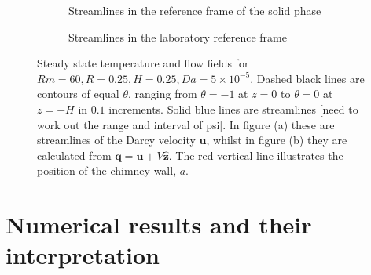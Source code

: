 \documentclass[11pt]{proc}
\begin{document}
\begin{figure}[ht!]
\centering
\begin{subfigure}[t]{.48\linewidth}
    \centering
   	\setlength\figureheight{5cm} 
	\setlength\figurewidth{6.5cm}
	
    \caption{Streamlines in the reference frame of the solid phase}
    \label{fig:steady-state-darcy}
 \end{subfigure}
 \quad
 \begin{subfigure}[t]{.48\linewidth}
    \centering
    \setlength\figureheight{5cm} 
	\setlength\figurewidth{6.5cm}
	
    \caption{Streamlines in the laboratory reference frame}
    \label{fig:steady-state-q}
 \end{subfigure}
    
    \caption{Steady state temperature and flow fields for $Rm=60, R=0.25, H=0.25, Da=5\times10^{-5}$. Dashed black lines are contours of equal $\theta$, ranging from $\theta=-1$ at $z=0$ to $\theta=0$ at $z=-H$ in $0.1$ increments. Solid blue lines are streamlines [need to work out the range and interval of psi]. In figure (a) these are streamlines of the Darcy velocity $\mathbf{u}$, whilst in figure (b) they are calculated from $\mathbf{q} = \mathbf{u} + V \mathbf{\hat{z}}$. The red vertical line illustrates the position of the chimney wall, $a$.}
    \label{fig:typical-steady-states}
 \end{figure}

\section{Numerical results and their interpretation}
\label{sec:results}


 
 
\end{document}
